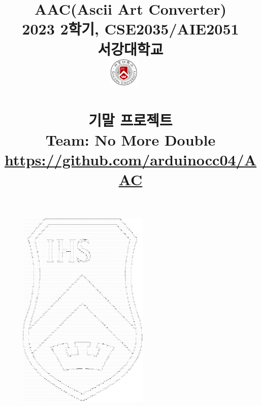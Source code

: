 \documentclass[conference]{IEEEtran}
\begin{document}
\newcommand{\libpng}{\textbf{libpng}}
\newcommand{\Eigen}{\textbf{Eigen}}
\newcommand{\Qt}{\textbf{Qt}}

\newcommand{\eg}{\textbf{eg}}
\newcommand{\egExceptions}{\textbf{egExceptions}}
\newcommand{\egGeometry}{\textbf{egGeometry}}
\newcommand{\egLoader}{\textbf{egLoader}}
\newcommand{\egMath}{\textbf{egMath}}
\newcommand{\egMethods}{\textbf{egMethods}}
\newcommand{\egOperators}{\textbf{egOperators}}
\newcommand{\egProcessing}{\textbf{egProcessing}}
\newcommand{\egTrace}{\textbf{egTrace}}
\newcommand{\egTypes}{\textbf{egTypes}}
\newcommand{\egTool}{\textbf{egTool}}

\newcommand{\imgascii}{\textbf{img2ascii}}
\newcommand{\tone}{\textbf{tone}}
\newcommand{\structure}{\textbf{structure}}

\title{AAC(Ascii Art Converter)\\ \vspace{1em}
{\large 2023 2학기, CSE2035/AIE2051 \\ 서강대학교 \\} \vspace{0.5em}
{\includegraphics[width=1.5cm]{./sogang_university_logo.png}}
{\large ~\\~}
{\large \\ 기말 프로젝트 \\ Team: No More Double \\ \vspace{-1em}\href{https://github.com/arduinocc04/AAC}{https://github.com/arduinocc04/AAC}}}
\author{
\and
{}
}

\begin{figure}
    \hspace{2.25em}
    \includegraphics[width=0.75\paperwidth]{ascii_logo_1.pdf}
\end{figure}
\end{document}
